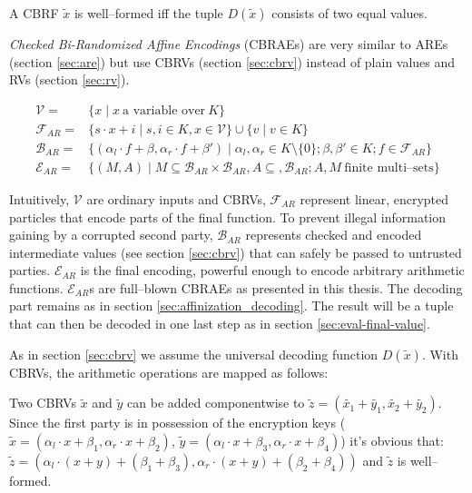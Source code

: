 A CBRF $\widetilde{x}$ is well--formed iff the tuple $D(\widetilde{x})$ consists
of two equal values.


\label{sec:cbrae}

\emph{Checked Bi-Randomized Affine Encodings} (CBRAEs) are very similar to AREs
(section \ref{sec:are}) but use CBRVs (section \ref{sec:cbrv}) instead of plain
values and RVs (section \ref{sec:rv}).

\begin{align}
  \mathcal{V} = & \{ x \mid x~\text{a variable over}~K \} \\
%
  \mathcal{F}_{AR} = & \{ s \cdot x + i \mid s, i \in K, x \in \mathcal{V} \}
  \cup \{ v \mid v \in K \} \\
%
  \mathcal{B}_{AR} = & \{ (\alpha_l \cdot f + \beta, \alpha_r \cdot f + \beta' )
  \mid \alpha_l, \alpha_r \in K \setminus \{0\}; \beta, \beta' \in K; f \in
  \mathcal{F}_{AR} \} \\
%
  \label{rel:cbrae}
  \mathcal{E}_{AR} = & \{ (M, A) \mid
    M \subseteq \mathcal{B}_{AR} \times \mathcal{B}_{AR},
    A \subseteq, \mathcal{B}_{AR};
    A, M~\text{finite multi--sets} \}
%
\end{align}

\noindent Intuitively, $\mathcal{V}$ are ordinary inputs and CBRVs,
$\mathcal{F}_{AR}$ represent linear, encrypted particles that encode parts of
the final function. To prevent illegal information gaining by a corrupted second
party, $\mathcal{B}_{AR}$ represents checked and encoded intermediate values
(see section \ref{sec:cbrv}) that can safely be passed to untrusted parties.
$\mathcal{E}_{AR}$ is the final encoding, powerful enough to encode arbitrary
arithmetic functions. $\mathcal{E}_{AR}$s are full--blown CBRAEs as presented in
this thesis. The decoding part remains as in section
\ref{sec:affinization_decoding}. The result will be a tuple that can then be
decoded in one last step as in section \ref{sec:eval-final-value}.


\label{sec:encode-cbrae}

As in section \ref{sec:cbrv} we assume the universal decoding function
$D(\widetilde{x})$. With CBRVs, the arithmetic operations are mapped as follows:



Two CBRVs $\widetilde{x}$ and $\widetilde{y}$ can be added componentwise to
$\widetilde{z} = \left(\widetilde{x_1} + \widetilde{y_1}, \widetilde{x_2} +
\widetilde{y_2}\right)$. Since the first party is in
possession of the encryption keys ($\widetilde{x} = \left(\alpha_l \cdot x +
\beta_1, \alpha_r \cdot x + \beta_2\right)$, $\widetilde{y} = \left(\alpha_l
\cdot x + \beta_3, \alpha_r \cdot x + \beta_4\right)$) it's obvious that:
$\widetilde{z} = \left(\alpha_l \cdot (x+y) + (\beta_1 + \beta_3), \alpha_r
\cdot (x+y) + (\beta_2 + \beta_4)\right)$ and $\widetilde{z}$ is well--formed.

